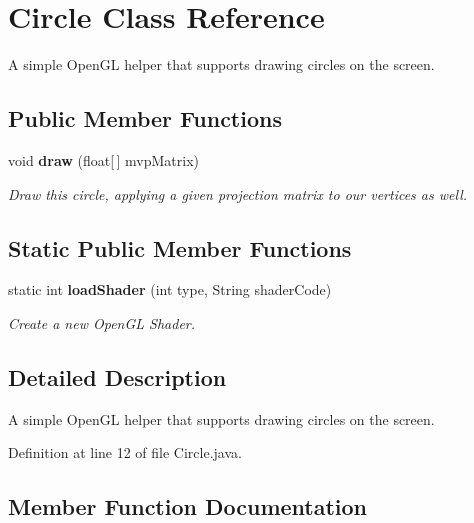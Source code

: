 \section{Circle Class Reference}
\label{classunitingtwist_1_1_circle}


A simple Open\+GL helper that supports drawing circles on the screen.  


\subsection*{Public Member Functions}
\begin{DoxyCompactItemize}
\item 
void \textbf{ draw} (float[$\,$] mvp\+Matrix)
\begin{DoxyCompactList}\small\item\em Draw this circle, applying a given projection matrix to our vertices as well. \end{DoxyCompactList}\end{DoxyCompactItemize}
\subsection*{Static Public Member Functions}
\begin{DoxyCompactItemize}
\item 
static int \textbf{ load\+Shader} (int type, String shader\+Code)
\begin{DoxyCompactList}\small\item\em Create a new Open\+GL Shader. \end{DoxyCompactList}\end{DoxyCompactItemize}


\subsection{Detailed Description}
A simple Open\+GL helper that supports drawing circles on the screen. 

Definition at line 12 of file Circle.\+java.



\subsection{Member Function Documentation}
\mbox{\label{classunitingtwist_1_1_circle_ace8a0d2a4e41b6d83897d48fd91a7ab3}} 
